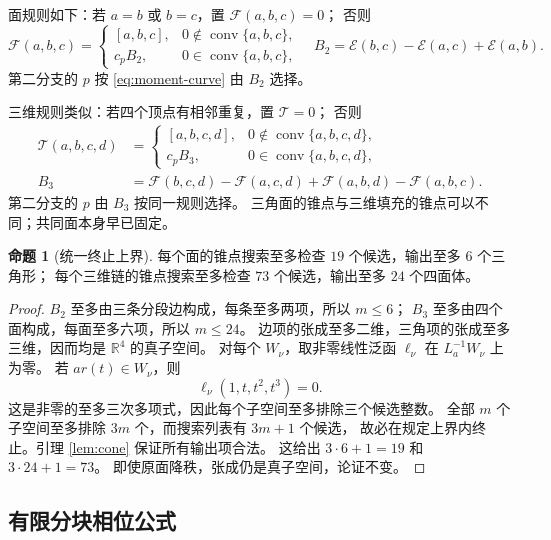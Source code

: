 \documentclass[UTF8,11pt,fontset=none]{ctexart}
\numberwithin{equation}{section}
\theoremstyle{definition}
\newtheorem{proposition}[theorem]{命题}
\DeclareMathOperator{\conv}{conv}
\newcommand{\R}{\mathbb R}
\begin{document}
面规则如下：若 $a=b$ 或 $b=c$，置 $\mathcal F(a,b,c)=0$；
否则
\begin{equation}
 \mathcal F(a,b,c)=
 \begin{cases}
 [a,b,c],&0\notin\conv\{a,b,c\},\\
 c_pB_2,&0\in\conv\{a,b,c\},
 \end{cases}
 \quad
 B_2=\mathcal E(b,c)-\mathcal E(a,c)+\mathcal E(a,b).
 \label{eq:F}
\end{equation}
第二分支的 $p$ 按 \eqref{eq:moment-curve} 由 $B_2$ 选择。

三维规则类似：若四个顶点有相邻重复，置 $\mathcal T=0$；
否则
\begin{align}
 \mathcal T(a,b,c,d)&=
 \begin{cases}
 [a,b,c,d],&0\notin\conv\{a,b,c,d\},\\
 c_pB_3,&0\in\conv\{a,b,c,d\},
 \end{cases}\label{eq:T}\\
 B_3&=\mathcal F(b,c,d)-\mathcal F(a,c,d)
      +\mathcal F(a,b,d)-\mathcal F(a,b,c).
 \label{eq:B3}
\end{align}
第二分支的 $p$ 由 $B_3$ 按同一规则选择。
三角面的锥点与三维填充的锥点可以不同；共同面本身早已固定。

\begin{proposition}[统一终止上界]\label{prop:termination}
每个面的锥点搜索至多检查 $19$ 个候选，输出至多 $6$ 个三角形；
每个三维链的锥点搜索至多检查 $73$ 个候选，输出至多 $24$ 个四面体。
\end{proposition}
\begin{proof}
$B_2$ 至多由三条分段边构成，每条至多两项，所以 $m\le6$；
$B_3$ 至多由四个面构成，每面至多六项，所以 $m\le24$。
边项的张成至多二维，三角项的张成至多三维，因而均是 $\R^4$ 的真子空间。
对每个 $W_\nu$，取非零线性泛函 $\ell_\nu$ 在 $L_a^{-1}W_\nu$ 上为零。
若 $ar(t)\in W_\nu$，则
\[
 \ell_\nu(1,t,t^2,t^3)=0.
\]
这是非零的至多三次多项式，因此每个子空间至多排除三个候选整数。
全部 $m$ 个子空间至多排除 $3m$ 个，而搜索列表有 $3m+1$ 个候选，
故必在规定上界内终止。引理 \ref{lem:cone} 保证所有输出项合法。
这给出 $3\cdot6+1=19$ 和 $3\cdot24+1=73$。
即使原面降秩，张成仍是真子空间，论证不变。
\end{proof}

\subsection{有限分块相位公式}
\end{document}
